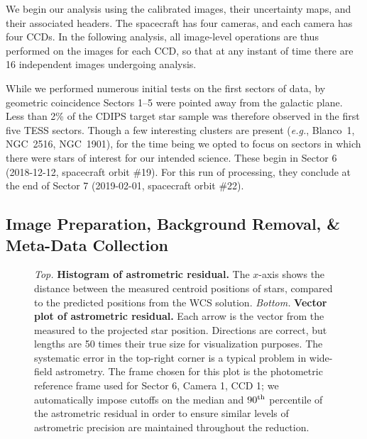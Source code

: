 \documentclass[12pt,twocolumn,tighten]{aastex62}
\begin{document}
We begin our analysis using the calibrated images, their uncertainty
maps, and their associated headers.  The spacecraft has four cameras,
and each camera has four CCDs.  In the following analysis, all
image-level operations are thus performed on the images for each CCD,
so that at any instant of time there are 16 independent images
undergoing analysis.

While we performed numerous initial tests on the first sectors of data,
by geometric coincidence Sectors 1--5 were pointed away from the galactic plane.
Less than 2\% of the CDIPS target star sample
was therefore observed in the first five TESS sectors.
Though a few interesting clusters are present ({\it e.g.}, Blanco~1, NGC~2516, NGC~1901),
for the time being we opted to focus on sectors in which there were stars
of interest for our intended science.
These begin in Sector 6 (2018-12-12, spacecraft orbit \#19).
For this run of processing, they conclude at the end of Sector 7
(2019-02-01, spacecraft orbit \#22).

\subsection{Image Preparation, Background Removal, \& Meta-Data Collection}
\label{subsec:preparation}


\begin{figure}[!t]
	\vspace{-0.8cm}
	\vspace{-0.8cm}
    \caption{
		{\it Top.} {\bf Histogram of astrometric residual.} The $x$-axis shows 
		the distance between the measured centroid positions of stars, 
		compared to the predicted positions from the WCS solution.
		{\it Bottom.} {\bf Vector plot of astrometric residual.} Each arrow is 
		the vector from the measured to the projected star position. 
		Directions are correct, but lengths are 50 times their true size for 
		visualization purposes.
        The systematic error in the top-right corner is a typical problem in 
        wide-field astrometry.
        The frame chosen for this plot is the photometric reference frame used 
        for Sector 6, Camera 1, CCD 1; we automatically 
        impose cutoffs on the median and $90^{\rm th}$ percentile of the 
        astrometric residual in order to ensure similar levels of astrometric 
        precision are maintained throughout the reduction.
	}
	\label{fig:astromresid}
\end{figure}
\end{document}
